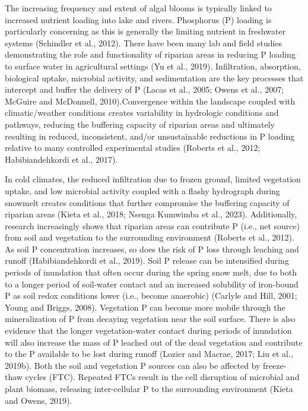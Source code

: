 \documentclass[
]{agujournal2019}
\begin{document}
The increasing frequency and extent of algal blooms is typically linked
to increased nutrient loading into lake and rivers. Phosphorus (P)
loading is particularly concerning as this is generally the limiting
nutrient in freshwater systems (Schindler et al., 2012). There have been
many lab and field studies demonstrating the role and functionality of
riparian areas in reducing P loading to surface water in agricultural
settings (Yu et al., 2019). Infiltration, absorption, biological uptake,
microbial activity, and sedimentation are the key processes that
intercept and buffer the delivery of P (Lacas et al., 2005; Owens et
al., 2007; McGuire and McDonnell, 2010).Convergence within the landscape
coupled with climatic/weather conditions creates variability in
hydrologic conditions and pathways, reducing the buffering capacity of
riparian areas and ultimately resulting in reduced, inconsistent, and/or
unsustainable reductions in P loading relative to many controlled
experimental studies (Roberts et al., 2012; Habibiandehkordi et al.,
2017).

In cold climates, the reduced infiltration due to frozen ground, limited
vegetation uptake, and low microbial activity coupled with a flashy
hydrograph during snowmelt creates conditions that further compromise
the buffering capacity of riparian areas (Kieta et al., 2018; Nsenga
Kumwimba et al., 2023). Additionally, research increasingly shows that
riparian areas can contribute P (i.e., net source) from soil and
vegetation to the surrounding environment (Roberts et al., 2012). As
soil P concentration increases, so does the risk of P loss through
leaching and runoff (Habibiandehkordi et al., 2019). Soil P release can
be intensified during periods of inundation that often occur during the
spring snow melt, due to both to a longer period of soil-water contact
and an increased solubility of iron-bound P as soil redox conditions
lower (i.e., become anaerobic) (Carlyle and Hill, 2001; Young and
Briggs, 2008). Vegetation P can become more mobile through the
mineralization of P from decaying vegetation near the soil surface.
There is also evidence that the longer vegetation-water contact during
periods of inundation will also increase the mass of P leached out of
the dead vegetation and contribute to the P available to be lost during
runoff (Lozier and Macrae, 2017; Liu et al., 2019b). Both the soil and
vegetation P sources can also be affected by freeze-thaw cycles (FTC).
Repeated FTCs result in the cell disruption of microbial and plant
biomass, releasing inter-cellular P to the surrounding environment
(Kieta and Owens, 2019).
\end{document}
